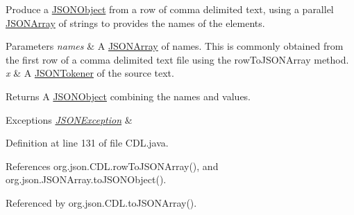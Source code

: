 Produce a \hyperlink{classorg_1_1json_1_1_j_s_o_n_object}{J\-S\-O\-N\-Object} from a row of comma delimited text, using a parallel \hyperlink{classorg_1_1json_1_1_j_s_o_n_array}{J\-S\-O\-N\-Array} of strings to provides the names of the elements. 
\begin{DoxyParams}{Parameters}
{\em names} & A \hyperlink{classorg_1_1json_1_1_j_s_o_n_array}{J\-S\-O\-N\-Array} of names. This is commonly obtained from the first row of a comma delimited text file using the row\-To\-J\-S\-O\-N\-Array method. \\
\hline
{\em x} & A \hyperlink{classorg_1_1json_1_1_j_s_o_n_tokener}{J\-S\-O\-N\-Tokener} of the source text. \\
\hline
\end{DoxyParams}
\begin{DoxyReturn}{Returns}
A \hyperlink{classorg_1_1json_1_1_j_s_o_n_object}{J\-S\-O\-N\-Object} combining the names and values. 
\end{DoxyReturn}

\begin{DoxyExceptions}{Exceptions}
{\em \hyperlink{classorg_1_1json_1_1_j_s_o_n_exception}{J\-S\-O\-N\-Exception}} & \\
\hline
\end{DoxyExceptions}


Definition at line 131 of file C\-D\-L.\-java.



References org.\-json.\-C\-D\-L.\-row\-To\-J\-S\-O\-N\-Array(), and org.\-json.\-J\-S\-O\-N\-Array.\-to\-J\-S\-O\-N\-Object().



Referenced by org.\-json.\-C\-D\-L.\-to\-J\-S\-O\-N\-Array().


